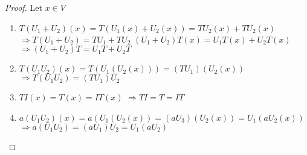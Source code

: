 \begin{proof}
	Let $x \in V $

\begin{enumerate}
\item \(T\left(U_{1}+U_{2}\right)(x)=T\left(U_{1}(x)+U_{2}(x)\right)=T U_{2}(x)+T U_{2}(x)\)
\(\Rightarrow T\left(U_{1}+U_{2}\right)=T U_{1}+T U_{2}\)
\(\left(U_{1}+U_{2}\right) T(x)=U_{1} T(x)+U_{2} T(x)\)
\(\Rightarrow\left(U_{1}+U_{2}\right) T=U_{1} T+U_{2} T\)
\item \(T\left(U_{1} U_{2}\right)(x)=T\left(U_{1}\left(U_{2}(x)\right)\right)=\left(T U_{1}\right)\left(U_{2}(x)\right)\)
\(\Rightarrow T\left(U_{1} U_{2}\right)=\left(T U_{1}\right) U_{2}\)
\item \(T I(x)=T(x)=I T(x)\) \(\Rightarrow T I=T=I T\)
\item  \(a\left(U_{1} U_{2}\right)(x)=a\left(U_{1}\left(U_{2}(x)\right)=\left(a U_{3}\right)\left(U_{2}(x)\right)=U_{1}\left(a U_{2}(x)\right)\right.\)
\(\Rightarrow a\left(U_{1} U_{2}\right)=\left(a U_{1}\right) U_{2}=U_{1}\left(a U_{2}\right) \quad\)

\end{enumerate}
\end{proof}


 